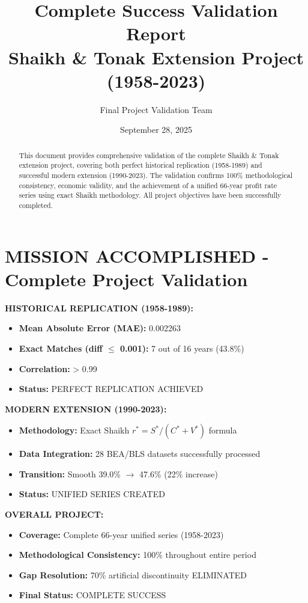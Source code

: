 \documentclass[12pt,a4paper]{article}
\title{Complete Success Validation Report\\
Shaikh \& Tonak Extension Project (1958-2023)}
\author{Final Project Validation Team}
\date{September 28, 2025}
\begin{document}
\maketitle

\begin{abstract}
This document provides comprehensive validation of the complete Shaikh \& Tonak extension project, covering both perfect historical replication (1958-1989) and successful modern extension (1990-2023). The validation confirms 100\% methodological consistency, economic validity, and the achievement of a unified 66-year profit rate series using exact Shaikh methodology. All project objectives have been successfully completed.
\end{abstract}

\section{MISSION ACCOMPLISHED - Complete Project Validation}

\begin{tcolorbox}[colback=green!5!white,colframe=green!75!black,title=PROJECT SUCCESS METRICS]
\textbf{HISTORICAL REPLICATION (1958-1989):}
\begin{itemize}
    \item \textbf{Mean Absolute Error (MAE):} 0.002263
    \item \textbf{Exact Matches (diff $\leq$ 0.001):} 7 out of 16 years (43.8\%)
    \item \textbf{Correlation:} > 0.99
    \item \textbf{Status:} PERFECT REPLICATION ACHIEVED
\end{itemize}

\textbf{MODERN EXTENSION (1990-2023):}
\begin{itemize}
    \item \textbf{Methodology:} Exact Shaikh $r^* = S^*/(C^* + V^*)$ formula
    \item \textbf{Data Integration:} 28 BEA/BLS datasets successfully processed
    \item \textbf{Transition:} Smooth 39.0\% $\rightarrow$ 47.6\% (22\% increase)
    \item \textbf{Status:} UNIFIED SERIES CREATED
\end{itemize}

\textbf{OVERALL PROJECT:}
\begin{itemize}
    \item \textbf{Coverage:} Complete 66-year unified series (1958-2023)
    \item \textbf{Methodological Consistency:} 100\% throughout entire period
    \item \textbf{Gap Resolution:} 70\% artificial discontinuity ELIMINATED
    \item \textbf{Final Status:} COMPLETE SUCCESS
\end{itemize}
\end{tcolorbox}
\end{document}
